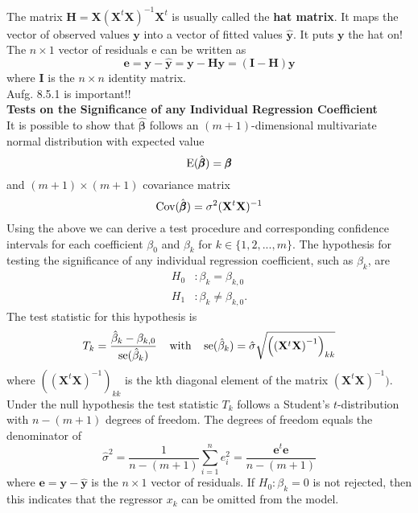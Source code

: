 The matrix $\mathbf{H} = \mathbf{X}(\mathbf{X}^t\mathbf{X})^{-1}\mathbf{X}^t$ is usually called the \textbf{hat matrix}. It maps the vector of observed values $\mathbf{y}$ into a vector of fitted values $\hat{\mathbf{y}}$. It puts $\mathbf{y}$ the hat on!\\
The $n \times 1$ vector of residuals e can be written as
\begin{equation}
  \mathbf{e} = \mathbf{y} - \hat{\mathbf{y}} = \mathbf{y} - \mathbf{H}\mathbf{y} = (\mathbf{I} - \mathbf{H}) \mathbf{y}
\end{equation}
where $\mathbf{I}$ is the $n \times n$ identity matrix.\\
Aufg. 8.5.1 is important!!\\

\textbf{Tests on the Significance of any Individual Regression Coefficient}\\
It is possible to show that $\hat{\pmb{\beta}}$ follows an $(m+1)$-dimensional multivariate normal distribution with expected value
\begin{equation}
  \textup{E}(\hat{\pmb{\beta}}) = \pmb{\beta}
\end{equation}
and $(m + 1) \times (m + 1)$ covariance matrix
\begin{equation}
  \textup{Cov}(\hat{\pmb{\beta}}) = \sigma^2 (\mathbf{X}^t \mathbf{X})^{-1}
\end{equation}
Using the above we can derive a test procedure and corresponding confidence intervals for
each coefficient $\beta_0$ and $\beta_k$ for $k \in \{1, 2, . . . , m\}$. The hypothesis for testing the significance of any individual regression coefficient, such as $\beta_k$, are
\begin{equation}
  \begin{split}
    H_0 &: \beta_k = \beta_{k,0}\\
    H_1 &: \beta_k \neq \beta_{k,0}.
  \end{split}
\end{equation}
The test statistic for this hypothesis is
\begin{equation}
  T_k = \frac{\hat{\beta}_k - \beta_{k, 0}}{\textup{se}(\hat{\beta}_k)}
  \;\;\;\; \text{with} \;\;\;\;
  \textup{se}(\hat{\beta}_k) = \hat{\sigma}\sqrt{\left(\left(\mathbf{X}^t\mathbf{X}\right)^{-1}\right)_{kk}}
\end{equation}
where $((\mathbf{X}^t\mathbf{X})^{-1})_{kk}$ is the kth diagonal element of the matrix $(\mathbf{X}^t\mathbf{X})^{-1})$. Under the null hypothesis the test statistic $T_k$ follows a Student’s $t$-distribution with $n - (m + 1)$ degrees of freedom. The degrees of freedom equals the denominator of
\begin{equation}
  \hat{\sigma}^2 = \frac{1}{n-(m+1)}\sum^n_{i=1} e^2_i =\frac{\mathbf{e}^t \mathbf{e}}{n-(m+1)}
\end{equation}
where $\mathbf{e} = \mathbf{y} - \hat{\mathbf{y}}$ is the $n \times 1$ vector of residuals. If $H_0 : \beta_k = 0$ is not rejected, then this indicates that the regressor $x_k$ can be omitted from the model.\\


